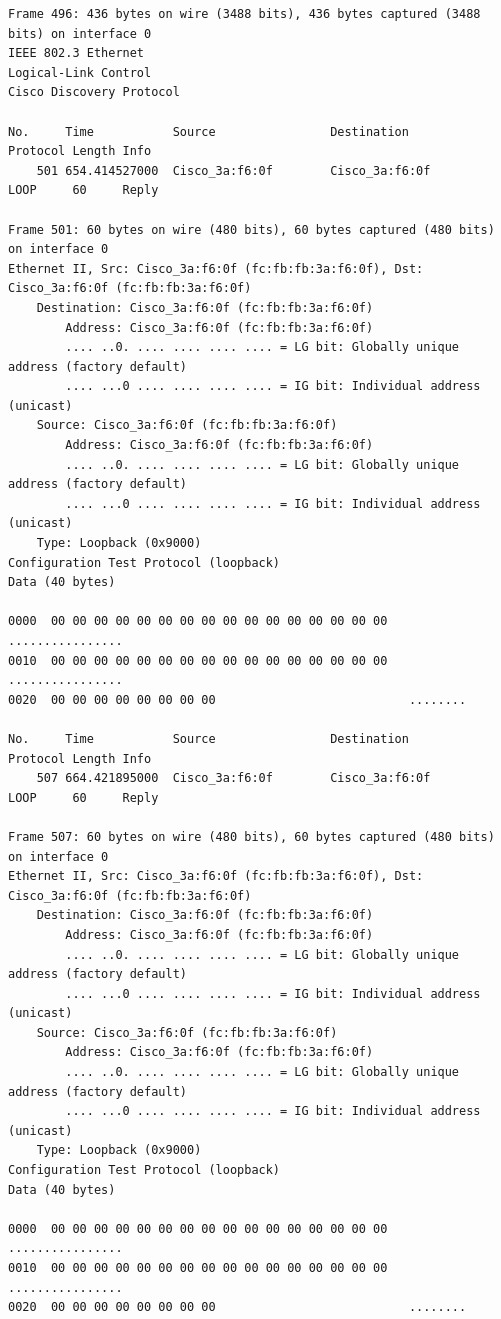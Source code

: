 \documentclass[a4paper,11pt]{article}
\begin{document}
\begin{lstlisting}
Frame 496: 436 bytes on wire (3488 bits), 436 bytes captured (3488 bits) on interface 0
IEEE 802.3 Ethernet 
Logical-Link Control
Cisco Discovery Protocol

No.     Time           Source                Destination           Protocol Length Info
    501 654.414527000  Cisco_3a:f6:0f        Cisco_3a:f6:0f        LOOP     60     Reply

Frame 501: 60 bytes on wire (480 bits), 60 bytes captured (480 bits) on interface 0
Ethernet II, Src: Cisco_3a:f6:0f (fc:fb:fb:3a:f6:0f), Dst: Cisco_3a:f6:0f (fc:fb:fb:3a:f6:0f)
    Destination: Cisco_3a:f6:0f (fc:fb:fb:3a:f6:0f)
        Address: Cisco_3a:f6:0f (fc:fb:fb:3a:f6:0f)
        .... ..0. .... .... .... .... = LG bit: Globally unique address (factory default)
        .... ...0 .... .... .... .... = IG bit: Individual address (unicast)
    Source: Cisco_3a:f6:0f (fc:fb:fb:3a:f6:0f)
        Address: Cisco_3a:f6:0f (fc:fb:fb:3a:f6:0f)
        .... ..0. .... .... .... .... = LG bit: Globally unique address (factory default)
        .... ...0 .... .... .... .... = IG bit: Individual address (unicast)
    Type: Loopback (0x9000)
Configuration Test Protocol (loopback)
Data (40 bytes)

0000  00 00 00 00 00 00 00 00 00 00 00 00 00 00 00 00   ................
0010  00 00 00 00 00 00 00 00 00 00 00 00 00 00 00 00   ................
0020  00 00 00 00 00 00 00 00                           ........

No.     Time           Source                Destination           Protocol Length Info
    507 664.421895000  Cisco_3a:f6:0f        Cisco_3a:f6:0f        LOOP     60     Reply

Frame 507: 60 bytes on wire (480 bits), 60 bytes captured (480 bits) on interface 0
Ethernet II, Src: Cisco_3a:f6:0f (fc:fb:fb:3a:f6:0f), Dst: Cisco_3a:f6:0f (fc:fb:fb:3a:f6:0f)
    Destination: Cisco_3a:f6:0f (fc:fb:fb:3a:f6:0f)
        Address: Cisco_3a:f6:0f (fc:fb:fb:3a:f6:0f)
        .... ..0. .... .... .... .... = LG bit: Globally unique address (factory default)
        .... ...0 .... .... .... .... = IG bit: Individual address (unicast)
    Source: Cisco_3a:f6:0f (fc:fb:fb:3a:f6:0f)
        Address: Cisco_3a:f6:0f (fc:fb:fb:3a:f6:0f)
        .... ..0. .... .... .... .... = LG bit: Globally unique address (factory default)
        .... ...0 .... .... .... .... = IG bit: Individual address (unicast)
    Type: Loopback (0x9000)
Configuration Test Protocol (loopback)
Data (40 bytes)

0000  00 00 00 00 00 00 00 00 00 00 00 00 00 00 00 00   ................
0010  00 00 00 00 00 00 00 00 00 00 00 00 00 00 00 00   ................
0020  00 00 00 00 00 00 00 00                           ........


\end{lstlisting}
\end{document}
